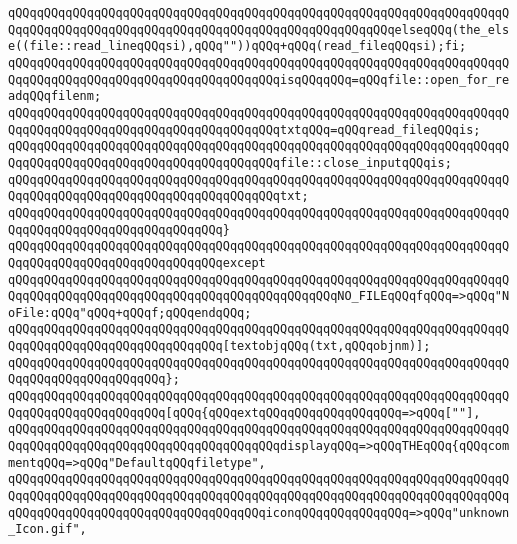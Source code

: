 \verb|qQQqqQQqqQQqqQQqqQQqqQQqqQQqqQQqqQQqqQQqqQQqqQQqqQQqqQQqqQQqqQQqqQQqqQQqqQQqqQQqqQQqqQQqqQQqqQQqqQQqqQQqqQQqqQQqqQQqqQQqqQQqelseqQQq(the_else((file::read_lineqQQqsi),qQQq""))qQQq+qQQq(read_fileqQQqsi);fi;|\newline
\newline
\verb|qQQqqQQqqQQqqQQqqQQqqQQqqQQqqQQqqQQqqQQqqQQqqQQqqQQqqQQqqQQqqQQqqQQqqQQqqQQqqQQqqQQqqQQqqQQqqQQqqQQqqQQqqQQqisqQQqqQQq=qQQqfile::open_for_readqQQqfilenm;|\newline
\verb|qQQqqQQqqQQqqQQqqQQqqQQqqQQqqQQqqQQqqQQqqQQqqQQqqQQqqQQqqQQqqQQqqQQqqQQqqQQqqQQqqQQqqQQqqQQqqQQqqQQqqQQqqQQqtxtqQQq=qQQqread_fileqQQqis;|\newline
\verb|qQQqqQQqqQQqqQQqqQQqqQQqqQQqqQQqqQQqqQQqqQQqqQQqqQQqqQQqqQQqqQQqqQQqqQQqqQQqqQQqqQQqqQQqqQQqqQQqqQQqqQQqqQQqfile::close_inputqQQqis;|\newline
\newline
\verb|qQQqqQQqqQQqqQQqqQQqqQQqqQQqqQQqqQQqqQQqqQQqqQQqqQQqqQQqqQQqqQQqqQQqqQQqqQQqqQQqqQQqqQQqqQQqqQQqqQQqqQQqqQQqtxt;|\newline
\verb|qQQqqQQqqQQqqQQqqQQqqQQqqQQqqQQqqQQqqQQqqQQqqQQqqQQqqQQqqQQqqQQqqQQqqQQqqQQqqQQqqQQqqQQqqQQqqQQqqQQq}|\newline
\verb|qQQqqQQqqQQqqQQqqQQqqQQqqQQqqQQqqQQqqQQqqQQqqQQqqQQqqQQqqQQqqQQqqQQqqQQqqQQqqQQqqQQqqQQqqQQqqQQqqQQqexcept|\newline
\verb|qQQqqQQqqQQqqQQqqQQqqQQqqQQqqQQqqQQqqQQqqQQqqQQqqQQqqQQqqQQqqQQqqQQqqQQqqQQqqQQqqQQqqQQqqQQqqQQqqQQqqQQqqQQqqQQqqQQqNO_FILEqQQqfqQQq=>qQQq"NoFile:qQQq"qQQq+qQQqf;qQQqendqQQq;|\newline
\newline
\verb|qQQqqQQqqQQqqQQqqQQqqQQqqQQqqQQqqQQqqQQqqQQqqQQqqQQqqQQqqQQqqQQqqQQqqQQqqQQqqQQqqQQqqQQqqQQqqQQqqQQq[textobjqQQq(txt,qQQqobjnm)];|\newline
\verb|qQQqqQQqqQQqqQQqqQQqqQQqqQQqqQQqqQQqqQQqqQQqqQQqqQQqqQQqqQQqqQQqqQQqqQQqqQQqqQQqqQQqqQQqqQQq};|\newline
\newline
\verb|qQQqqQQqqQQqqQQqqQQqqQQqqQQqqQQqqQQqqQQqqQQqqQQqqQQqqQQqqQQqqQQqqQQqqQQqqQQqqQQqqQQqqQQqqQQq[qQQq{qQQqextqQQqqQQqqQQqqQQqqQQq=>qQQq[""],|\newline
\verb|qQQqqQQqqQQqqQQqqQQqqQQqqQQqqQQqqQQqqQQqqQQqqQQqqQQqqQQqqQQqqQQqqQQqqQQqqQQqqQQqqQQqqQQqqQQqqQQqqQQqqQQqqQQqdisplayqQQq=>qQQqTHEqQQq{qQQqcommentqQQq=>qQQq"DefaultqQQqfiletype",|\newline
\verb|qQQqqQQqqQQqqQQqqQQqqQQqqQQqqQQqqQQqqQQqqQQqqQQqqQQqqQQqqQQqqQQqqQQqqQQqqQQqqQQqqQQqqQQqqQQqqQQqqQQqqQQqqQQqqQQqqQQqqQQqqQQqqQQqqQQqqQQqqQQqqQQqqQQqqQQqqQQqqQQqqQQqqQQqqQQqqQQqiconqQQqqQQqqQQqqQQq=>qQQq"unknown_Icon.gif",|\newline
